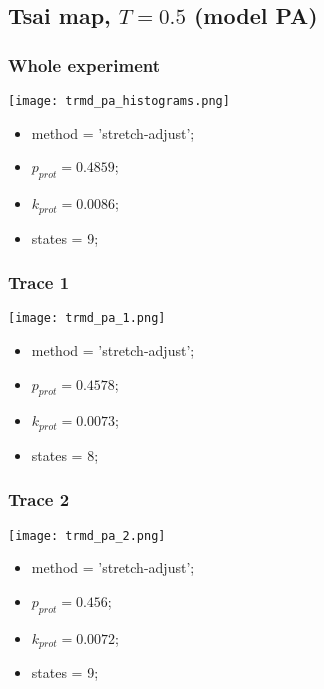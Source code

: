 \subsection{Tsai map, $T=0.5$ (model PA)}
\subsubsection{Whole experiment}
\begin{minipage}[c]{0.7\textwidth}
    \texttt{[image: trmd\_pa\_histograms.png]}
\end{minipage}
\hfill
\begin{minipage}[c]{0.45\textwidth}
    \begin{itemize}
        \item method = 'stretch-adjust';
        \item $p_{prot}=0.4859$;
        \item $k_{prot}=0.0086$;
        \item states = 9;
    \end{itemize}
\end{minipage}

\subsubsection{Trace 1}
\begin{minipage}[c]{0.7\textwidth}
    \texttt{[image: trmd\_pa\_1.png]}
\end{minipage}
\hfill
\begin{minipage}[c]{0.45\textwidth}
    \begin{itemize}
        \item method = 'stretch-adjust';
        \item $p_{prot}=0.4578$;
        \item $k_{prot}=0.0073$;
        \item states = 8;
    \end{itemize}
\end{minipage}

\subsubsection{Trace 2}
\begin{minipage}[c]{0.7\textwidth}
    \texttt{[image: trmd\_pa\_2.png]}
\end{minipage}
\hfill
\begin{minipage}[c]{0.45\textwidth}
    \begin{itemize}
        \item method = 'stretch-adjust';
        \item $p_{prot}=0.456$;
        \item $k_{prot}=0.0072$;
        \item states = 9;
    \end{itemize}
\end{minipage}

